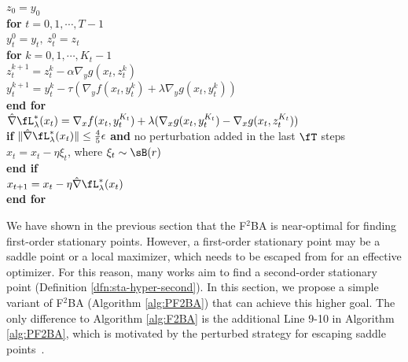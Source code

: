 \documentclass{article}
\begin{document}
\begin{algorithm*}[t]  
\caption{Perturbed F${}^2$BA$\left(x_0,y_0, \eta,\tau,\alpha, \lambda, T,\{K_t\}_{t=0}^{T-1}, \epsilon,r ,\fT \right)$} \label{alg:PF2BA}
\begin{algorithmic}[1] 
\STATE $ z_0 = y_0$ \\[1mm]
\STATE \textbf{for} $ t =0,1,\cdots,T-1 $ \\[1mm]
\STATE \quad $ y_t^0 =  y_{t}, ~ z_t^0 = z_{t}$ \\[1mm]
\STATE \quad \textbf{for} $ k =0,1,\cdots,K_t-1$ \\[1mm]
\STATE \quad \quad $ z_t^{k+1} = z_t^{k}- \alpha \nabla_y g(x_t, z_t^k)   $ \\[1mm]
\STATE \quad \quad $ y_t^{k+1} = y_t^k - \tau \left( \nabla_y f(x_t,y_t^k) +  \lambda  \nabla_y g(x_t,y_t^k) \right)$ \\[1mm]
\STATE \quad \textbf{end for} \\[1mm]
\STATE \quad $ \hat \nabla \fL_{\lambda}^*(x_t)= \nabla_x f(x_t,y_{t}^{K_t}) + \lambda ( \nabla_x g(x_t,y_{t}^{K_t}) - \nabla_x g(x_t,z_{t}^{K_t}) )$ \\[1mm]
\STATE \quad \textbf{if} $ \Vert \hat \nabla \fL_{\lambda}^*(x_t) \Vert \le \frac{4}{5} \epsilon$ \textbf{and} no perturbation added in the last $\fT  $ steps \\[1mm]
\STATE \quad \quad $x_{t} = x_t - \eta \xi_t $, where $\xi_t \sim \sB(r)$  \\[1mm]
\STATE \quad \textbf{end if} \\[1mm]
\STATE \quad $x_{t+1} = x_t -  \eta  \hat \nabla \fL_{\lambda}^*(x_t)$ \\[1mm]
\STATE \textbf{end for} \\[1mm]
\end{algorithmic}
\end{algorithm*}

We have shown in the previous section that the F${}^2$BA is near-optimal for finding first-order stationary points. However, a first-order stationary point may be a saddle point or a local maximizer, which needs to be escaped from for an effective optimizer.
For this reason, many works aim to find a second-order stationary point (Definition \ref{dfn:sta-hyper-second}).
In this section, we propose a simple variant of F${}^2$BA (Algorithm \ref{alg:PF2BA}) that can achieve this higher goal. 
The only difference to Algorithm \ref{alg:F2BA} is the additional Line 9-10 in Algorithm \ref{alg:PF2BA}, which is motivated by the perturbed strategy for escaping saddle points~\citep{jin2017escape}.
\end{document}
